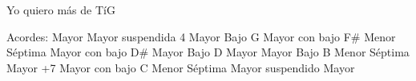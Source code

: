 \documentclass[12pt, spanish]{book}
\begin{document}
\begin{song}{Yo quiero más de Tí}{G}
        \ifChordBk
        \begin{SBOpGroup}
            Acordes:\break
             Mayor \hfill
             Mayor suspendida 4 \hfill\null\break
             Mayor Bajo G \hfill
             Mayor con bajo F\# \hfill\null\break
             Menor S\'eptima \hfill
             Mayor con bajo D\# \hfill\null\break
             Mayor Bajo D \hfill
             Mayor \hfill\null\break
             Mayor Bajo B \hfill
             Menor S\'eptima \hfill\null\break
             Mayor \hfill
             +7 \hfill\null\break
             Mayor con bajo C \hfill
             Menor S\'eptima \hfill\null\break
             Mayor suspendido \hfill
             Mayor \hfill\null\break
        \end{SBOpGroup}
        \fi
    \end{song}

    \ifChordBk
        
        \theendnotes
        
        
        
    \fi

    
\end{document}
